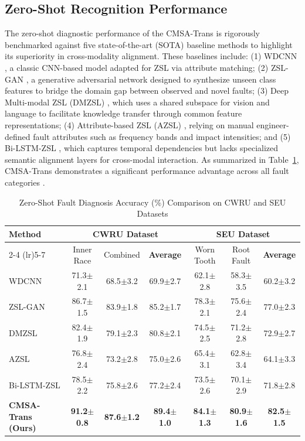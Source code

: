 \documentclass[journal]{IEEEtran}
\begin{document}
\subsection{Zero-Shot Recognition Performance}
The zero-shot diagnostic performance of the CMSA-Trans is rigorously benchmarked against five state-of-the-art (SOTA) baseline methods to highlight its superiority in cross-modality alignment. These baselines include: (1) WDCNN \cite{zhang2017new}, a classic CNN-based model adapted for ZSL via attribute matching; (2) ZSL-GAN \cite{xian2019fvaegan}, a generative adversarial network designed to synthesize unseen class features to bridge the domain gap between observed and novel faults; (3) Deep Multi-modal ZSL (DMZSL) \cite{schonfeld2019generalized}, which uses a shared subspace for vision and language to facilitate knowledge transfer through common feature representations; (4) Attribute-based ZSL (AZSL) \cite{lampert2014attribute}, relying on manual engineer-defined fault attributes such as frequency bands and impact intensities; and (5) Bi-LSTM-ZSL \cite{chen2019bearing}, which captures temporal dependencies but lacks specialized semantic alignment layers for cross-modal interaction. As summarized in Table~\ref{tab:comparison}, CMSA-Trans demonstrates a significant performance advantage across all fault categories \cite{li2022zero, lu2017deep}.

\begin{table}[!t]
\centering
\caption{Zero-Shot Fault Diagnosis Accuracy (\%) Comparison on CWRU and SEU Datasets}
\label{tab:comparison}
\renewcommand{\arraystretch}{1.2}
\begin{tabular}{lcccccc}
\toprule
\multirow{2}{*}{\textbf{Method}} & \multicolumn{3}{c}{\textbf{CWRU Dataset}} & \multicolumn{3}{c}{\textbf{SEU Dataset}} \\
\cmidrule(lr){2-4} \cmidrule(lr){5-7}
 & Inner Race & Combined & \textbf{Average} & Worn Tooth & Root Fault & \textbf{Average} \\
\midrule
WDCNN \cite{zhang2017new} & 71.3$\pm$2.1 & 68.5$\pm$3.2 & 69.9$\pm$2.7 & 62.1$\pm$2.8 & 58.3$\pm$3.5 & 60.2$\pm$3.2 \\
ZSL-GAN \cite{xian2019fvaegan} & 86.7$\pm$1.5 & 83.9$\pm$1.8 & 85.2$\pm$1.7 & 78.3$\pm$2.1 & 75.6$\pm$2.4 & 77.0$\pm$2.3 \\
DMZSL \cite{schonfeld2019generalized} & 82.4$\pm$1.9 & 79.1$\pm$2.3 & 80.8$\pm$2.1 & 74.5$\pm$2.5 & 71.2$\pm$2.8 & 72.9$\pm$2.7 \\
AZSL \cite{lampert2014attribute} & 76.8$\pm$2.4 & 73.2$\pm$2.8 & 75.0$\pm$2.6 & 65.4$\pm$3.1 & 62.8$\pm$3.4 & 64.1$\pm$3.3 \\
Bi-LSTM-ZSL \cite{chen2019bearing} & 78.5$\pm$2.2 & 75.8$\pm$2.6 & 77.2$\pm$2.4 & 73.5$\pm$2.6 & 70.1$\pm$2.9 & 71.8$\pm$2.8 \\
\midrule
\textbf{CMSA-Trans (Ours)} & \textbf{91.2$\pm$0.8} & \textbf{87.6$\pm$1.2} & \textbf{89.4$\pm$1.0} & \textbf{84.1$\pm$1.3} & \textbf{80.9$\pm$1.6} & \textbf{82.5$\pm$1.5} \\
\bottomrule
\end{tabular}
\end{table}
\end{document}
